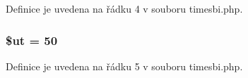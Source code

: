 Definice je uvedena na řádku 4 v souboru timesbi.\-php.

\hypertarget{timesbi_8php_aadd3f841051043ee58e587e840e8dd0b}{
\subsubsection[{\$ut}]{\setlength{\rightskip}{0pt plus 5cm}\$ut = 50}}\label{timesbi_8php_aadd3f841051043ee58e587e840e8dd0b}


Definice je uvedena na řádku 5 v souboru timesbi.\-php.

